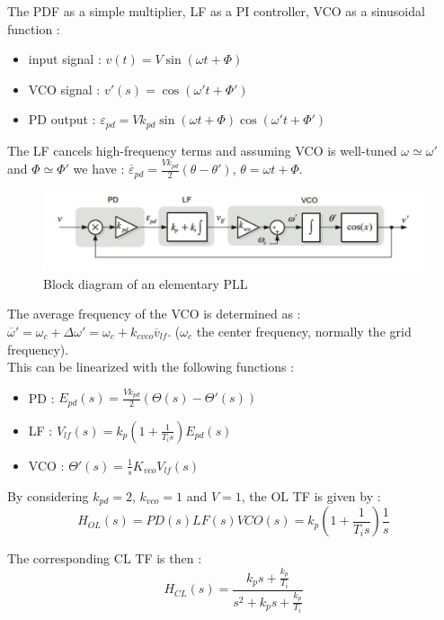 \documentclass[../main.tex]{subfiles}
\begin{document}
The PDF as a simple multiplier, LF as a PI controller, VCO as a sinusoidal function : \begin{itemize}
    \item input signal : $v(t) = V\sin(\omega t + \Phi)$
    \item VCO signal : $v'(s) = \cos(\omega' t + \Phi')$
    \item PD output : $\varepsilon_{pd} = V k_{pd} \sin(\omega t + \Phi) \cos( \omega' t + \Phi')$
\end{itemize}

The LF cancels high-frequency terms and assuming VCO is well-tuned $\omega \simeq \omega'$ and $\Phi \simeq \Phi'$ we have : $\overline{\varepsilon}_{pd} = \frac{Vk_{pd}}{2} (\theta - \theta')$, $\theta = \omega t + \Phi$.\\

\begin{figure}[hbt!]
    \centering
    \includegraphics[width=0.7\linewidth]{IMAGES/Indus_el/IMG_0192.jpeg}
    \caption{Block diagram of an elementary PLL}
    \label{fig:elemPLL}
\end{figure}

The average frequency of the VCO is determined as : $\overline{\omega}' = \omega_c + \Delta \omega' = \omega_c + k_{cvco} \overline{ v}_{lf}$. ($\omega_c$ the center frequency, normally the grid frequency).\\

This can be linearized with the following functions : \begin{itemize}
    \item PD : $E_{pd}(s) = \frac{V k_{pd}}{2} (\Theta(s) - \Theta'(s))$
    \item LF : $V_{lf}(s) = k_p (1 + \frac{1}{T_is}) E_{pd}(s)$
    \item VCO : $\Theta'(s) = \frac{1}{s}K_{vco} V_{lf}(s)$
\end{itemize}

By considering $k_{pd} = 2$, $k_{vco} = 1$ and $V=1$, the OL TF is given by : \begin{equation}
    H_{OL}(s) = PD(s) LF(s) VCO(s) = k_p (1+ \frac{1}{T_is}) \frac{1}{s}
\end{equation}

The corresponding CL TF is then : \begin{equation}
    H_{CL}(s) = \frac{k_p s + \frac{k_p}{T_i}}{s^2 + k_p s + \frac{k_p}{T_i}}
\end{equation}
\end{document}

